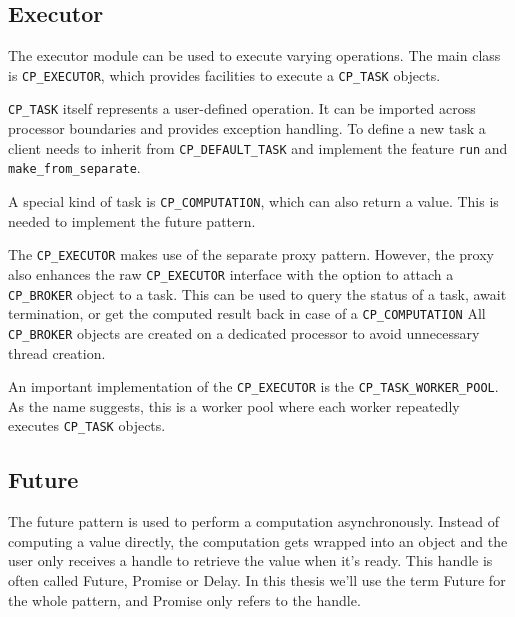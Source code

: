 \documentclass[a4paper,10pt]{report}
\begin{document}
\subsection{Executor}

The executor module can be used to execute varying operations.
The main class is \lstinline!CP_EXECUTOR!, which provides facilities to execute a \lstinline!CP_TASK! objects.

\lstinline!CP_TASK! itself represents a user-defined operation.
It can be imported across processor boundaries and provides exception handling.
To define a new task a client needs to inherit from \lstinline!CP_DEFAULT_TASK! and implement the feature \lstinline!run! and \lstinline!make_from_separate!.

A special kind of task is \lstinline!CP_COMPUTATION!, which can also return a value.
This is needed to implement the future pattern.

The \lstinline!CP_EXECUTOR! makes use of the separate proxy pattern.
However, the proxy also enhances the raw \lstinline!CP_EXECUTOR! interface with the option to attach a \lstinline!CP_BROKER! object to a task.
This can be used to query the status of a task, await termination, or get the computed result back in case of a \lstinline!CP_COMPUTATION!
All \lstinline!CP_BROKER! objects are created on a dedicated processor to avoid unnecessary thread creation.

An important implementation of the \lstinline!CP_EXECUTOR! is the \lstinline!CP_TASK_WORKER_POOL!.
As the name suggests, this is a worker pool where each worker repeatedly executes \lstinline!CP_TASK! objects.





\subsection{Future}

The future pattern is used to perform a computation asynchronously.
Instead of computing a value directly, the computation gets wrapped into an object and the user only receives a handle to retrieve the value when it's ready.
This handle is often called Future, Promise or Delay.
In this thesis we'll use the term Future for the whole pattern, and Promise only refers to the handle.
\end{document}
